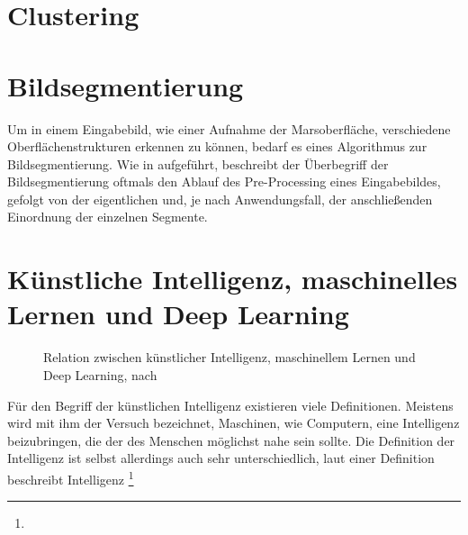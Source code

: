 \section{Clustering}
\label{sec:clustering}


\section{Bildsegmentierung}
\label{sec:segmentierung}

Um in einem Eingabebild, wie \zB einer Aufnahme der Marsoberfläche, verschiedene Oberflächenstrukturen erkennen zu können, bedarf es eines Algorithmus zur Bildsegmentierung. Wie in \cite{bildsegmentierung_14} aufgeführt, beschreibt der Überbegriff der Bildsegmentierung oftmals den Ablauf des Pre-Processing eines Eingabebildes, gefolgt von der eigentlichen  und, je nach Anwendungsfall, der anschließenden Einordnung der einzelnen Segmente.

\section{Künstliche Intelligenz, maschinelles Lernen und Deep Learning}

\begin{wrapfigure}{r}{0.33\textwidth}
\captionsetup{format=plain}
\caption{Relation zwischen künstlicher Intelligenz, maschinellem Lernen und Deep Learning, nach \cite[Kap.~1.1]{deeplearning_18}}
\label{fig:ai_ml_dl}
\end{wrapfigure}

Für den Begriff der künstlichen Intelligenz existieren viele Definitionen. Meistens wird mit ihm der Versuch bezeichnet, Maschinen, wie \zB Computern, eine Intelligenz beizubringen, die der des Menschen möglichst nahe sein sollte. Die Definition der Intelligenz ist selbst allerdings auch sehr unterschiedlich, laut einer Definition beschreibt Intelligenz \footnote{}

